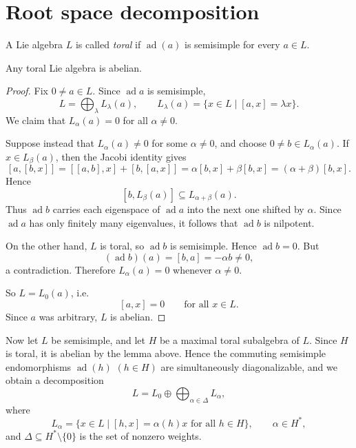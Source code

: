\section{Root space decomposition}

\begin{definition}
    A Lie algebra $L$ is called \emph{toral} if $\operatorname{ad}(a)$ is semisimple
    for every $a\in L$.
\end{definition}

\begin{lemma}
    Any toral Lie algebra is abelian.
\end{lemma}

\begin{proof}
    Fix $0 \neq a \in L$. Since $\operatorname{ad} a$ is semisimple,
    \[
        L=\bigoplus_{\lambda} L_\lambda(a),
        \qquad
        L_\lambda(a)=\{x\in L\mid [a,x]=\lambda x\}.
    \]
    We claim that $L_\alpha(a)=0$ for all $\alpha\neq 0$.

    Suppose instead that $L_\alpha(a)\neq 0$ for some $\alpha\neq 0$, and choose
    $0\neq b\in L_\alpha(a)$. If $x\in L_\beta(a)$, then the Jacobi identity gives
    \[
        [a,[b,x]]
        =
        [[a,b],x]+[b,[a,x]]
        =
        \alpha[b,x]+\beta[b,x]
        =
        (\alpha+\beta)[b,x].
    \]
    Hence
    \[
        [b,L_\beta(a)]\subseteq L_{\alpha+\beta}(a).
    \]
    Thus $\operatorname{ad} b$ carries each eigenspace of $\operatorname{ad} a$ into the
    next one shifted by $\alpha$. Since $\operatorname{ad} a$ has only finitely many
    eigenvalues, it follows that $\operatorname{ad} b$ is nilpotent.

    On the other hand, $L$ is toral, so $\operatorname{ad} b$ is semisimple. Hence
    $\operatorname{ad} b=0$. But
    \[
        (\operatorname{ad} b)(a)=[b,a]=-\alpha b\neq 0,
    \]
    a contradiction. Therefore $L_\alpha(a)=0$ whenever $\alpha\neq 0$.

    So $L=L_0(a)$, i.e.
    \[
        [a,x]=0
        \qquad\text{for all }x\in L.
    \]
    Since $a$ was arbitrary, $L$ is abelian.
\end{proof}

Now let $L$ be semisimple, and let $H$ be a maximal toral subalgebra of $L$.
Since $H$ is toral, it is abelian by the lemma above. Hence the commuting
semisimple endomorphisms $\operatorname{ad}(h)$ $(h\in H)$ are simultaneously
diagonalizable, and we obtain a decomposition
\[
    L=L_0\oplus \bigoplus_{\alpha\in \Delta} L_\alpha,
\]
where
\[
    L_\alpha=\{x\in L\mid [h,x]=\alpha(h)x \text{ for all } h\in H\},
    \qquad \alpha\in H^*,
\]
and $\Delta\subseteq H^*\setminus\{0\}$ is the set of nonzero weights.


